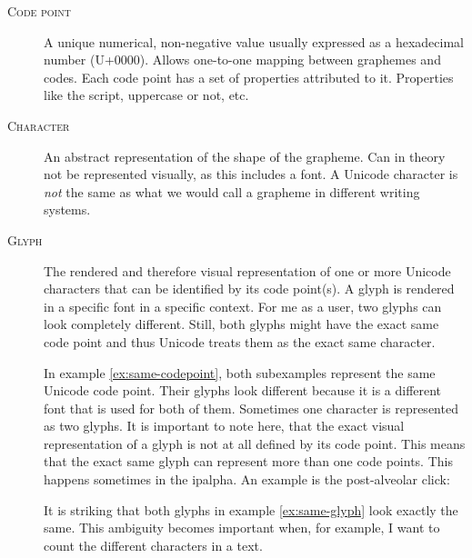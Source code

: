 \begin{description}
\item[\textsc{Code point}] A unique numerical, non-negative value usually expressed as a hexadecimal number (U+0000). Allows one-to-one mapping between graphemes and codes. Each code point has a set of properties attributed to it. Properties like the script, uppercase or not, etc.
\item[\textsc{Character}] An abstract representation of the shape of the grapheme. Can in theory not be represented visually, as this includes a font. A Unicode character is \textit{not} the same as what we would call a grapheme in different writing systems.
\item[\textsc{Glyph}] The rendered and therefore visual representation of one or more Unicode characters that can be identified by its code point(s). A glyph is rendered in a specific font in a specific context. For me as a user, two glyphs can look completely different. Still, both glyphs might have the exact same code point and thus Unicode treats them as the exact same character. 


In example \ref{ex:same-codepoint}, both subexamples represent the same Unicode code point. Their glyphs look different because it is a different font that is used for both of them.
Sometimes one character is represented as two glyphs. It is important to note here, that the exact visual representation of a glyph is not at all defined by its code point. This means that the exact same glyph can represent more than one code points. This happens sometimes in the \ac{ipalpha}. An example is the post-alveolar click:


It is striking that both glyphs in example \ref{ex:same-glyph} look exactly the same. This ambiguity becomes important when, for example, I want to count the different characters in a text.

\end{description}

